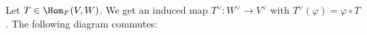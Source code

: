     \begin{definition}\label{def:induced-dual}
        Let $T \in \Hom_F{(V,W)}$. We get an induced map $T^\vee : W^\vee \rightarrow V^\vee$ with $T^\vee(\varphi) = \varphi \circ T$. The following diagram commutes:
            \begin{center}
            \end{center}
    \end{definition}